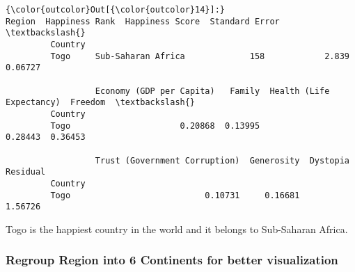 \documentclass[11pt]{article}
\begin{document}
\begin{Verbatim}[commandchars=\\\{\}]
{\color{outcolor}Out[{\color{outcolor}14}]:}                      Region  Happiness Rank  Happiness Score  Standard Error  \textbackslash{}
         Country                                                                        
         Togo     Sub-Saharan Africa             158            2.839         0.06727   
         
                  Economy (GDP per Capita)   Family  Health (Life Expectancy)  Freedom  \textbackslash{}
         Country                                                                         
         Togo                      0.20868  0.13995                   0.28443  0.36453   
         
                  Trust (Government Corruption)  Generosity  Dystopia Residual  
         Country                                                                
         Togo                           0.10731     0.16681            1.56726  
\end{Verbatim}
            
    Togo is the happiest country in the world and it belongs to Sub-Saharan
Africa.

    \subsubsection{Regroup Region into 6 Continents for better
visualization}\label{regroup-region-into-6-continents-for-better-visualization}
\end{document}
